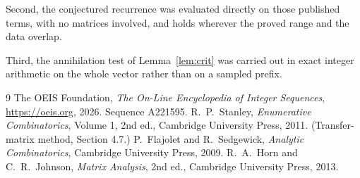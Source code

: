 \documentclass[11pt,a4paper]{article}
\theoremstyle{plain}
\theoremstyle{definition}
\begin{document}
Second, the conjectured recurrence was evaluated directly on those published terms, with no
matrices involved, and holds wherever the proved range and the data overlap.

Third, the annihilation test of Lemma~\ref{lem:crit} was carried out in exact integer
arithmetic on the whole vector rather than on a sampled prefix.

\begin{thebibliography}{9}
 The OEIS Foundation, \emph{The On-Line Encyclopedia of Integer
Sequences}, \url{https://oeis.org}, 2026. Sequence A221595.
 R.~P.~Stanley, \emph{Enumerative Combinatorics}, Volume 1, 2nd ed.,
Cambridge University Press, 2011. (Transfer-matrix method, Section 4.7.)
 P.~Flajolet and R.~Sedgewick, \emph{Analytic Combinatorics}, Cambridge
University Press, 2009.
 R.~A.~Horn and C.~R.~Johnson, \emph{Matrix Analysis}, 2nd ed., Cambridge
University Press, 2013.
\end{thebibliography}
\end{document}

